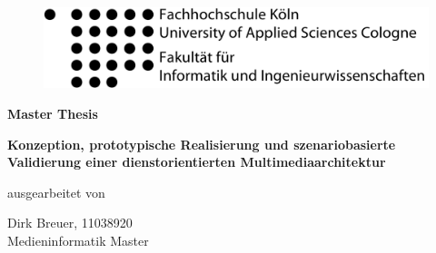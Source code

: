 
\begin{titlepage}

\begin{center}

\begin{figure}[!ht]
	\flushleft
		\includegraphics[natwidth=920pt, natheight=95pt, width=.5\textwidth]{images/fh_logo.pdf}
\end{figure}

\vspace{0.8cm}

\begin{large}
\begin{scshape}
\textbf{Master Thesis}\\[0.8em]
\end{scshape}
\end{large}

\begin{rmfamily}
\textbf{\LARGE Konzeption, prototypische Realisierung und szenariobasierte Validierung einer dienstorientierten Multimediaarchitektur}\\
\normalsize
\end{rmfamily}

\vspace{0.8cm}

% 

\begin{large}
ausgearbeitet von\\ 
\vspace{0.2cm}
\begin{Large}
Dirk Breuer, 11038920\\Medieninformatik Master\\
\end{Large}
\end{large}


\end{center}
\end{titlepage}
